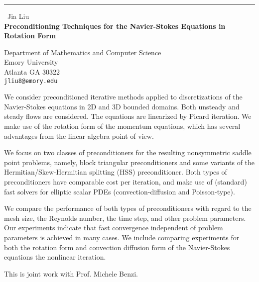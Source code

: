 \documentclass{report}
\begin{document}
\begin{center}
\rule{6in}{1pt} \
{\large Jia Liu \\
{\bf Preconditioning Techniques for the Navier-Stokes Equations in Rotation Form}}

Department of Mathematics and Computer Science \\ Emory University \\ Atlanta GA 30322
\\
{\tt jliu8@emory.edu}\end{center}

We consider preconditioned iterative methods applied to
discretizations of the Navier-Stokes equations in 2D and 3D bounded
domains. Both unsteady and steady flows are considered. The
equations are linearized by Picard iteration. We make use of the
rotation form of the momentum equations, which has several
advantages from the linear algebra point of view.


We focus on two classes of preconditioners for the resulting
nonsymmetric saddle point problems, namely, block triangular
preconditioners and some variants of the Hermitian/Skew-Hermitian
splitting (HSS) preconditioner. Both types of preconditioners have
comparable cost per iteration, and make use of (standard) fast
solvers for elliptic scalar PDEs (convection-diffusion and
Poisson-type).


We compare the performance of both types of preconditioners with
regard to the mesh size, the Reynolds number, the time step, and
other problem parameters. Our experiments indicate that fast
convergence independent of problem parameters is achieved in many
cases. We include comparing experiments for both the rotation form
and convection diffusion form of the Navier-Stokes equations the
nonlinear iteration.


This is joint work with Prof. Michele Benzi.
\end{document}
